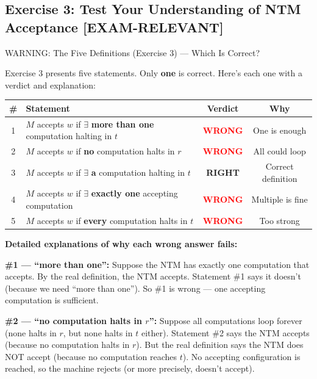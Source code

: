 \documentclass[11pt,a4paper]{article}
\newcommand{\kemark}{\textcolor{red!70!black}{\textbf{[EXAM-RELEVANT]}}}
\begin{document}
\subsection{Exercise 3: Test Your Understanding of NTM Acceptance \kemark}

\begin{conceptbox}{{WARNING: The Five Definitions (Exercise 3) --- Which Is Correct?}}

Exercise 3 presents five statements. Only \textbf{one} is correct. Here's each one with a verdict and explanation:

\renewcommand{\arraystretch}{1.5}
\begin{center}
\begin{tabular}{cp{7cm}cc}
\toprule
\textbf{\#} & \textbf{Statement} & \textbf{Verdict} & \textbf{Why} \\
\midrule
1 & $M$ accepts $w$ if $\exists$ \textbf{more than one} computation halting in $t$ & \textcolor{red}{\textbf{WRONG}} & One is enough \\
2 & $M$ accepts $w$ if \textbf{no} computation halts in $r$ & \textcolor{red}{\textbf{WRONG}} & All could loop \\
3 & $M$ accepts $w$ if $\exists$ \textbf{a} computation halting in $t$ & \textcolor{green!60!black}{\textbf{RIGHT}} & Correct definition \\
4 & $M$ accepts $w$ if $\exists$ \textbf{exactly one} accepting computation & \textcolor{red}{\textbf{WRONG}} & Multiple is fine \\
5 & $M$ accepts $w$ if \textbf{every} computation halts in $t$ & \textcolor{red}{\textbf{WRONG}} & Too strong \\
\bottomrule
\end{tabular}
\end{center}

\textbf{Detailed explanations of why each wrong answer fails:}

\textbf{\#1 --- ``more than one'':} Suppose the NTM has exactly one computation that accepts. By the real definition, the NTM accepts. Statement \#1 says it doesn't (because we need ``more than one''). So \#1 is wrong --- one accepting computation is sufficient.

\textbf{\#2 --- ``no computation halts in $r$'':} Suppose all computations loop forever (none halts in $r$, but none halts in $t$ either). Statement \#2 says the NTM accepts (because no computation halts in $r$). But the real definition says the NTM does NOT accept (because no computation reaches $t$). No accepting configuration is reached, so the machine rejects (or more precisely, doesn't accept).


\end{conceptbox}
\end{document}

